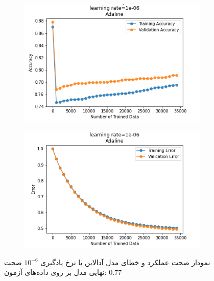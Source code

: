 \documentclass[12pt, a4paper]{article}
\begin{document}
\begin{figure}[h]
    \begin{subfigure}{0.45\linewidth}
        \centering
        \includegraphics[width=\linewidth]{images/3/adaline/lr/acc_1e-06.png}
    \end{subfigure}
    \hfil
    \begin{subfigure}{0.45\linewidth}
        \centering
        \includegraphics[width=\linewidth]{images/3/adaline/lr/error_1e-06.png}
    \end{subfigure}
    \caption{نمودار صحت عملکرد‌ و خطای مدل آدالاین با نرخ یادگیری $10^{-6}$
    \newline
    صحت نهایی مدل بر روی داده‌های آزمون: $0.77$}
\end{figure}
\end{document}
